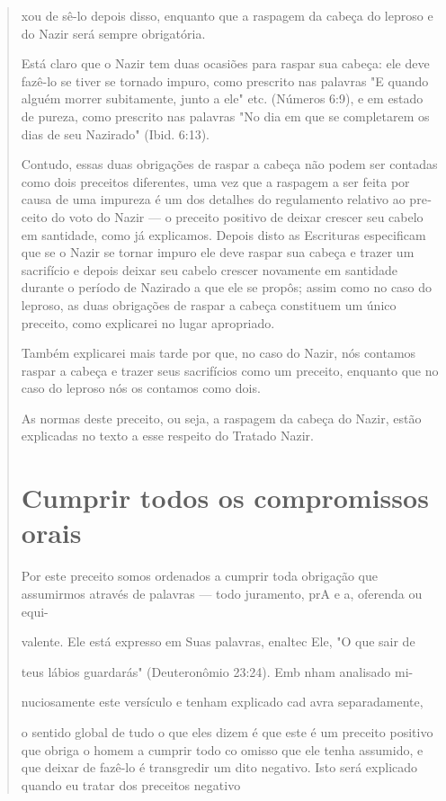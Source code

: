 \begin{quote}xou de sê-lo depois disso, enquanto que a raspagem da cabeça do leproso
e do Nazir será sempre obrigatória.

Está claro que o Nazir tem duas ocasiões para raspar sua cabeça: ele
deve fazê-lo se tiver se tornado impuro, como prescrito nas palavras "E
quan­do alguém morrer subitamente, junto a ele" etc. (Números 6:9), e em
estado de pureza, como prescrito nas palavras "No dia em que se
completarem os dias de seu Nazirado" (Ibid. 6:13).

Contudo, essas duas obrigações de raspar a cabeça não podem ser contadas
como dois preceitos diferentes, uma vez que a raspagem a ser feita por
causa de uma impureza é um dos detalhes do regulamento relativo ao
pre­ceito do voto do Nazir --- o preceito positivo de deixar crescer seu
cabelo em santidade, como já explicamos. Depois disto as Escrituras
especificam que se o Nazir se tornar impuro ele deve raspar sua cabeça e
trazer um sacrifício e de­pois deixar seu cabelo crescer novamente em
santidade durante o período de Nazirado a que ele se propôs; assim como
no caso do leproso, as duas obriga­ções de raspar a cabeça constituem um
único preceito, como explicarei no lu­gar apropriado.

Também explicarei mais tarde por que, no caso do Nazir, nós conta­mos
raspar a cabeça e trazer seus sacrifícios como um preceito, enquanto que
no caso do leproso nós os contamos como dois.

As normas deste preceito, ou seja, a raspagem da cabeça do Nazir, estão
explicadas no texto a esse respeito do Tratado Nazir.

\section{Cumprir todos os compromissos orais}

Por este preceito somos ordenados a cumprir toda obrigação que
assumirmos através de palavras --- todo juramento, prA e a, oferenda ou
equi-

valente. Ele está expresso em Suas palavras, enaltec Ele, "O que sair de

teus lábios guardarás" (Deuteronômio 23:24). Emb nham analisado mi-

nuciosamente este versículo e tenham explicado cad avra separadamente,

o sentido global de tudo o que eles dizem é que este é um preceito
positivo que obriga o homem a cumprir todo co omisso que ele tenha
assumido, e que deixar de fazê-lo é transgredir um dito negativo. Isto
será explicado quando eu tratar dos preceitos negativo


\end{quote}
